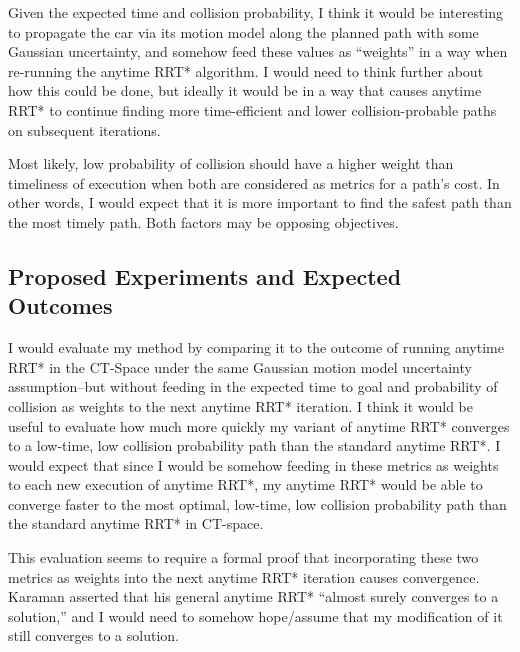 \documentclass[12pt]{article}
\begin{document}
Given the expected time and collision probability, I think it would be interesting to propagate the car via its motion model along the planned path with some Gaussian uncertainty, and somehow feed these values as ``weights'' in a way when re-running the anytime RRT* algorithm. I would need to think further about how this could be done, but ideally it would be in a way that causes anytime RRT* to continue finding more time-efficient and lower collision-probable paths on subsequent iterations.

Most likely, low probability of collision should have a higher weight than timeliness of execution when both are considered as metrics for a path's cost. In other words, I would expect that it is more important to find the safest path than the most timely path. Both factors may be opposing objectives.

\subsection*{Proposed Experiments and Expected Outcomes}
I would evaluate my method by comparing it to the outcome of running anytime RRT* in the CT-Space under the same Gaussian motion model uncertainty assumption--but without feeding in the expected time to goal and probability of collision as weights to the next anytime RRT* iteration. I think it would be useful to evaluate how much more quickly my variant of anytime RRT* converges to a low-time, low collision probability path than the standard anytime RRT*. I would expect that since I would be somehow feeding in these metrics as weights to each new execution of anytime RRT*, my anytime RRT* would be able to converge faster to the most optimal, low-time, low collision probability path than the standard anytime RRT* in CT-space.

This evaluation seems to require a formal proof that incorporating these two metrics as weights into the next anytime RRT* iteration causes convergence. Karaman asserted that his general anytime RRT* ``almost surely converges to a solution,'' and I would need to somehow hope/assume that my modification of it still converges to a solution.
\end{document}
